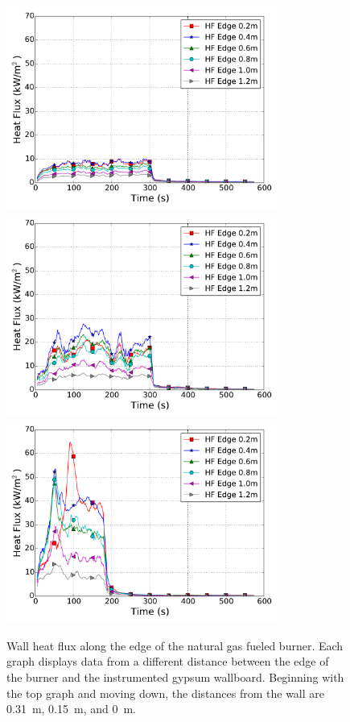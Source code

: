 \documentclass[twoside]{uocthesis}
\begin{document}
 \begin{figure}[p]
 	\centering
 	\includegraphics[width=3.5in]{../Figures/IWGBNG01_HF_Offset_Avg}\\
 	\includegraphics[width=3.5in]{../Figures/IWGBNG04_HF_Offset_Avg}\\
 	\includegraphics[width=3.5in]{../Figures/IWGBNG05_HF_Offset_Avg}\\
 	\caption[Wall heat flux along the edge of the natural gas fueled burner]{Wall heat flux along the edge of the natural gas fueled burner. Each graph displays data from a different distance between the edge of the burner and the instrumented gypsum wallboard.  Beginning with the top graph and moving down, the distances from the wall are 0.31~m, 0.15~m, and 0~m.}
 	\label{IWGB_NG_HF_EdgeSet}
 \end{figure}
\end{document}

